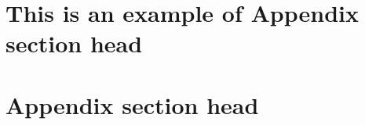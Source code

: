\documentclass[prodmode,acmtecs]{acmsmall} %
\begin{document}

\begin{acks}
\end{acks}  





\elecappendix

\medskip

\section{This is an example of Appendix section head}


\section{Appendix section head}
\end{document}
